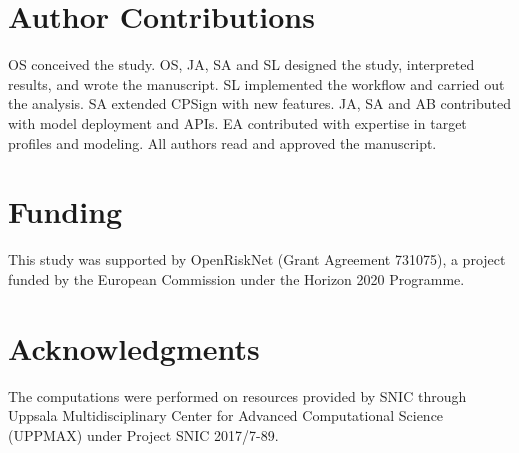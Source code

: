 \documentclass[utf8]{frontiersSCNS} %
\begin{document}
\section{Author Contributions}
OS conceived the study. OS, JA, SA and SL designed the study, interpreted
results, and wrote the manuscript. SL implemented the workflow and carried out
the analysis. SA extended CPSign with new features. JA, SA and AB contributed
with model deployment and APIs. EA contributed with expertise in target
profiles and modeling. All authors read and approved the manuscript.



\section{Funding}
This study was supported by OpenRiskNet (Grant Agreement 731075), a project
funded by the European Commission under the Horizon 2020 Programme.

\section{Acknowledgments}
The computations were performed on resources provided by SNIC through Uppsala
Multidisciplinary Center for Advanced Computational Science (UPPMAX) under
Project SNIC 2017/7-89.



\end{document}
